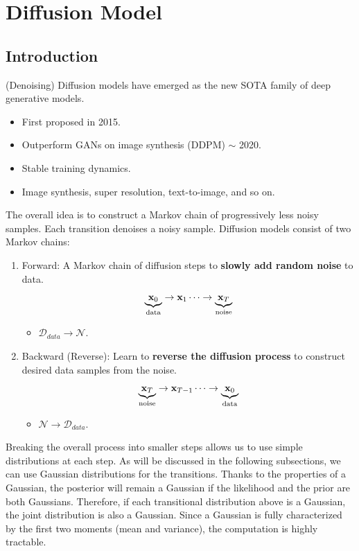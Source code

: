 \chapter{Diffusion Model}
\section{Introduction}

	(Denoising) Diffusion models have emerged as the new SOTA family of deep generative models. 
	\begin{itemize}
		\item First proposed in 2015.
		\item Outperform GANs on image synthesis (DDPM) $\sim$ 2020.
		\item Stable training dynamics.
		\item Image synthesis, super resolution, text-to-image, and so on.
	\end{itemize}

The overall idea is to construct a Markov chain of progressively less noisy samples. Each transition denoises a noisy sample. Diffusion models consist of two Markov chains:
\begin{enumerate}
	\item Forward: A Markov chain of diffusion steps to \textbf{slowly add random noise} to data. 
		$$\underbrace{{\mathbf{x}}_0}_{\text{data}}\to {\mathbf{x}}_1\cdots\to \underbrace{{\mathbf{x}}_T}_{\text{noise}}$$
		\begin{itemize}
			\item $\mathcal{D}_{data}\to \mathcal{N}$.
		\end{itemize}
	\item Backward (Reverse): Learn to \textbf{reverse the diffusion process} to construct desired data samples from the noise. 
		$$\underbrace{{\mathbf{x}}_T}_{\text{noise}}\to {\mathbf{x}}_{T-1}\cdots\to \underbrace{{\mathbf{x}}_0}_{\text{data}}$$

		\begin{itemize}
			\item $\mathcal{N}\to \mathcal{D}_{data}$.
		\end{itemize}
\end{enumerate}
Breaking the overall process into smaller steps allows us to use simple distributions at each step. As will be discussed in the following subsections, we can use Gaussian distributions for the transitions. Thanks to the properties of a Gaussian, the posterior will remain a Gaussian if the likelihood and the prior are both Gaussians. Therefore, if each transitional distribution above is a Gaussian, the joint distribution is also a Gaussian. Since a Gaussian is fully characterized by the first two moments (mean and variance), the computation is highly tractable. 

